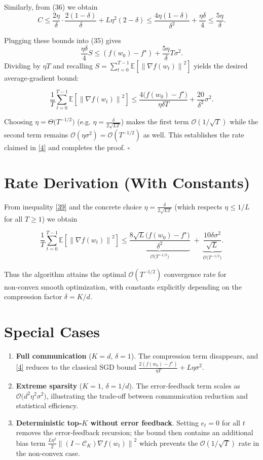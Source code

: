 \documentclass{article}
\newcommand{\E}{\mathbb{E}}
\newcommand{\norm}[1]{\left\|#1\right\|}
\newcommand{\cK}{\mathcal{C}_{K}}
\begin{document}
Similarly, from (36) we obtain
\[
C\le \frac{2\eta}{\delta}\cdot\frac{2(1-\delta)}{\delta}+L\eta^{2}(2-\delta)
\le \frac{4\eta(1-\delta)}{\delta^{2}}+ \frac{\eta\delta}{4}
\le \frac{5\eta}{\delta}. \tag{38}
\]

Plugging these bounds into (35) gives
\[
\frac{\eta\delta}{4}S \le (f(w_{0})-f^{\star}) + \frac{5\eta}{\delta}T\sigma^{2}.
\]
Dividing by $\eta T$ and recalling $S=\sum_{t=0}^{T-1}\E[\norm{\nabla f(w_{t})}^{2}]$ yields the desired average‑gradient bound:

\[
\frac{1}{T}\sum_{t=0}^{T-1}\E[\norm{\nabla f(w_{t})}^{2}]
\le \frac{4\bigl(f(w_{0})-f^{\star}\bigr)}{\eta\delta T}
+ \frac{20}{\delta^{2}}\sigma^{2}. \tag{39}
\]

Choosing $\eta = \Theta\!\bigl(T^{-1/2}\bigr)$ (e.g. $\eta = \frac{\delta}{2\sqrt{LT}}$) makes the first term $\mathcal{O}(1/\sqrt{T})$ while the second term remains $\mathcal{O}(\eta\sigma^{2}) = \mathcal{O}(T^{-1/2})$ as well. This establishes the rate claimed in \eqref{4} and completes the proof. \hfill $\square$

\section*{Rate Derivation (With Constants)}
From inequality \eqref{39} and the concrete choice $\eta = \frac{\delta}{2\sqrt{L T}}$ (which respects $\eta\le 1/L$ for all $T\ge 1$) we obtain

\[
\frac{1}{T}\sum_{t=0}^{T-1}\E[\norm{\nabla f(w_{t})}^{2}]
\le
\underbrace{\frac{8\sqrt{L}\bigl(f(w_{0})-f^{\star}\bigr)}{\delta^{2}}}_{\displaystyle\mathcal{O}\!\bigl(T^{-1/2}\bigr)}
\;+\;
\underbrace{\frac{10\delta\sigma^{2}}{\sqrt{L}}}_{\displaystyle\mathcal{O}\!\bigl(T^{-1/2}\bigr)}.
\]

Thus the algorithm attains the optimal $\mathcal{O}(T^{-1/2})$ convergence rate for non‑convex smooth optimization, with constants explicitly depending on the compression factor $\delta=K/d$.

\section*{Special Cases}
\begin{enumerate}[label=(\roman*)]
\item \textbf{Full communication} ($K=d$, $\delta=1$). The compression term disappears, and \eqref{4} reduces to the classical SGD bound $\frac{2(f(w_{0})-f^{\star})}{\eta T}+L\eta\sigma^{2}$.
\item \textbf{Extreme sparsity} ($K=1$, $\delta=1/d$). The error‑feedback term scales as $\mathcal{O}\!\bigl(d^{2}\eta^{2}\sigma^{2}\bigr)$, illustrating the trade‑off between communication reduction and statistical efficiency.
\item \textbf{Deterministic top‑$K$ without error feedback}. Setting $e_{t}=0$ for all $t$ removes the error‑feedback recursion; the bound then contains an additional bias term $\frac{L\eta^{2}}{2}\norm{(I-\cK)\nabla f(w_{t})}^{2}$ which prevents the $\mathcal{O}(1/\sqrt{T})$ rate in the non‑convex case.
\end{enumerate}

\end{document}
